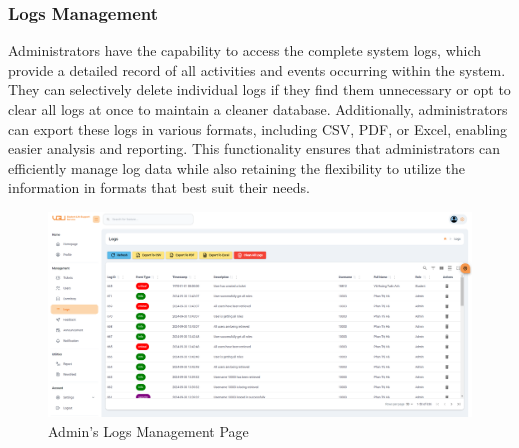 	\subsubsection{Logs Management}
	Administrators have the capability to access the complete system logs, which provide a detailed record of all activities and events occurring within the system. They can selectively delete individual logs if they find them unnecessary or opt to clear all logs at once to maintain a cleaner database. Additionally, administrators can export these logs in various formats, including CSV, PDF, or Excel, enabling easier analysis and reporting. This functionality ensures that administrators can efficiently manage log data while also retaining the flexibility to utilize the information in formats that best suit their needs.
	\begin{figure}[H]
		\centering
		\includegraphics[width=1\linewidth]{graphics/gui/admin/logs-mng}
		\caption{Admin's Logs Management Page}
		\label{fig:gui-ad-logs-mng}
	\end{figure}
	
	
